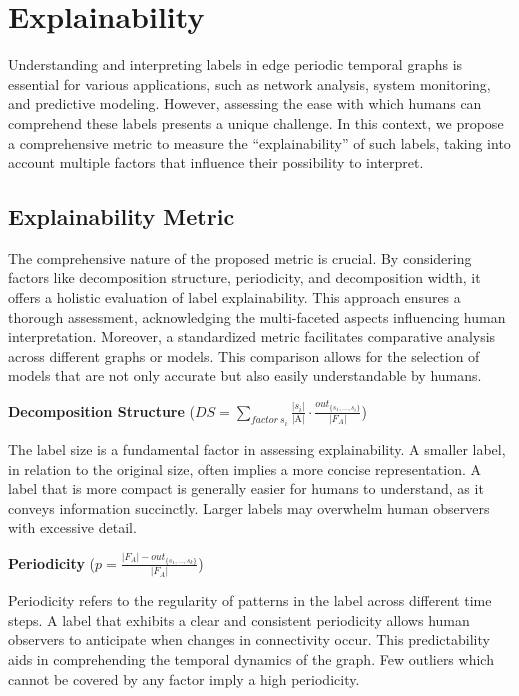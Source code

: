 \chapter{Explainability}

Understanding and interpreting labels in edge periodic temporal graphs is essential for various applications, such as network analysis, system monitoring, and predictive modeling. However, assessing the ease with which humans can comprehend these labels presents a unique challenge. In this context, we propose a comprehensive metric to measure the \enquote{explainability} of such labels, taking into account multiple factors that influence their possibility to interpret. 

\section{Explainability Metric}
The comprehensive nature of the proposed metric is crucial. By considering factors like decomposition structure, periodicity, and decomposition width, it offers a holistic evaluation of label explainability. This approach ensures a thorough assessment, acknowledging the multi-faceted aspects influencing human interpretation. Moreover, a standardized metric facilitates comparative analysis across different graphs or models. This comparison allows for the selection of models that are not only accurate but also easily understandable by humans.

\textbf{Decomposition Structure} ($DS = \sum\limits_{factor~ s_i}\frac{|s_i|}{\text{|A|}} \cdot \frac{out_{\{s_1,\dots,s_i\}}}{|F_A|}$)

The label size is a fundamental factor in assessing explainability. A smaller label, in relation to the original size, often implies a more concise representation. A label that is more compact is generally easier for humans to understand, as it conveys information succinctly. Larger labels may overwhelm human observers with excessive detail.

\textbf{Periodicity} ($p = \frac{|F_A| - out_{\{s_1,\dots,s_k\}}}{|F_A|}$)

Periodicity refers to the regularity of patterns in the label across different time steps. A label that exhibits a clear and consistent periodicity allows human observers to anticipate when changes in connectivity occur. This predictability aids in comprehending the temporal dynamics of the graph. Few outliers which cannot be covered by any factor imply a high periodicity.

